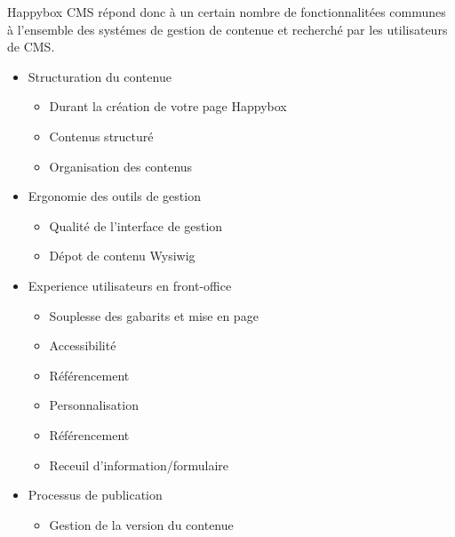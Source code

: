 \documentclass[11pt, a4paper ]{article}
\begin{document}

Happybox CMS répond donc à un certain nombre de fonctionnalitées communes à l'ensemble des systémes de gestion de contenue et recherché par les utilisateurs de CMS\cite{enqueteCMSSmile}.

\begin{itemize}
	\item Structuration du contenue

		\begin{itemize}
			\item Durant la création de votre page Happybox

			\item Contenus structuré

			\item Organisation des contenus

		\end{itemize}

	\item Ergonomie des outils de gestion

		\begin{itemize}
			\item Qualité de l'interface de gestion

			\item Dépot de contenu Wysiwig

		\end{itemize}

	\item Experience utilisateurs en front-office
		\begin{itemize}
			\item Souplesse des gabarits et mise en page

			\item Accessibilité

			\item Référencement

			\item Personnalisation

			\item Référencement

			\item Receuil d'information/formulaire

		\end{itemize}

	\item Processus de publication
		\begin{itemize}
			\item Gestion de la version du contenue


\end{itemize}
\end{itemize}
\end{document}

